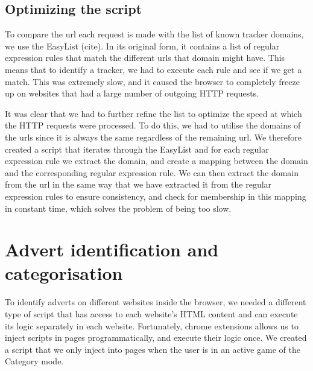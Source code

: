 \documentclass{l4proj}
\begin{document}
\subsection{Optimizing the script}
To compare the url each request is made with the list of known tracker domains, we use the EasyList (cite). In its original form, it contains a list of regular expression rules that match the different urls that domain might have. This means that to identify a tracker, we had to execute each rule and see if we get a match. This was extremely slow, and it caused the browser to completely freeze up on websites that had a large number of outgoing HTTP requests.

It was clear that we had to further refine the list to optimize the speed at which the HTTP requests were processed. To do this, we had to utilise the domains of the urls since it is always the same regardless of the remaining url. We therefore created a script that iterates through the EasyList and for each regular expression rule we extract the domain, and create a mapping between the domain and the corresponding regular expression rule. We can then extract the domain from the url in the same way that we have extracted it from the regular expression rules to ensure consistency, and check for membership in this mapping in constant time, which solves the problem of being too slow.

\section{Advert identification and categorisation}
To identify adverts on different websites inside the browser, we needed a different type of script that has access to each website's HTML content and can execute its logic separately in each website. Fortunately, chrome extensions allows us to inject scripts in pages programmatically, and execute their logic once. We created a script that we only inject into pages when the user is in an active game of the Category mode. 
\end{document}
